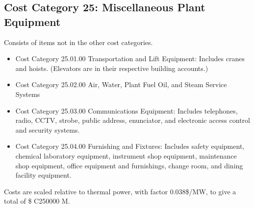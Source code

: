 
\subsection{Cost Category 25: Miscellaneous Plant Equipment}  %

Consists of items not in the other cost categories.

\begin{itemize}

    \item Cost Category 25.01.00 Transportation and Lift Equipment: Includes cranes and hoists. (Elevators are in their respective building accounts.)

    \item  Cost Category 25.02.00 Air, Water, Plant Fuel Oil, and Steam Service Systems

    \item  Cost Category 25.03.00 Communications Equipment: Includes telephones, radio, CCTV, strobe, public address, enunciator, and electronic access control and security systems.

    \item  Cost Category 25.04.00 Furnishing and Fixtures: Includes safety equipment, chemical laboratory equipment, instrument shop equipment, maintenance shop equipment, office equipment and furnishings, change room, and dining facility equipment.

\end{itemize}

Costs are scaled relative to thermal power, with factor 0.038\$/MW, to give a total of \$ C250000 M.